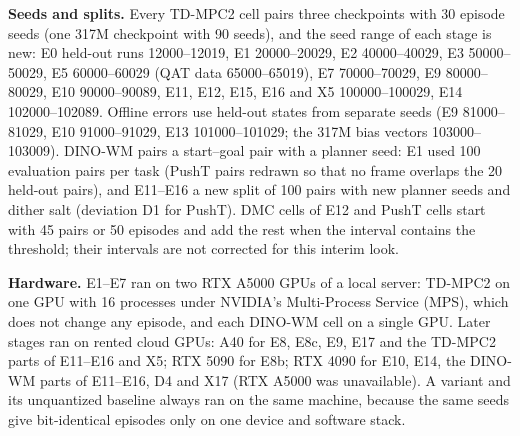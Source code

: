 \textbf{Seeds and splits.} Every TD-MPC2 cell pairs three checkpoints with 30 episode seeds (one 317M checkpoint with 90 seeds), and the seed range of each stage is new: E0 held-out runs 12000--12019, E1 20000--20029, E2 40000--40029, E3 50000--50029, E5 60000--60029 (QAT data 65000--65019), E7 70000--70029, E9 80000--80029, E10 90000--90089, E11, E12, E15, E16 and X5 100000--100029, E14 102000--102089. Offline errors use held-out states from separate seeds (E9 81000--81029, E10 91000--91029, E13 101000--101029; the 317M bias vectors 103000--103009). DINO-WM pairs a start--goal pair with a planner seed: E1 used 100 evaluation pairs per task (PushT pairs redrawn so that no frame overlaps the 20 held-out pairs), and E11--E16 a new split of 100 pairs with new planner seeds and dither salt (deviation D1 for PushT). DMC cells of E12 and PushT cells start with 45 pairs or 50 episodes and add the rest when the interval contains the threshold; their intervals are not corrected for this interim look.

\textbf{Hardware.} E1--E7 ran on two RTX A5000 GPUs of a local server: TD-MPC2 on one GPU with 16 processes under NVIDIA's Multi-Process Service (MPS), which does not change any episode, and each DINO-WM cell on a single GPU. Later stages ran on rented cloud GPUs: A40 for E8, E8c, E9, E17 and the TD-MPC2 parts of E11--E16 and X5; RTX 5090 for E8b; RTX 4090 for E10, E14, the DINO-WM parts of E11--E16, D4 and X17 (RTX A5000 was unavailable). A variant and its unquantized baseline always ran on the same machine, because the same seeds give bit-identical episodes only on one device and software stack.
